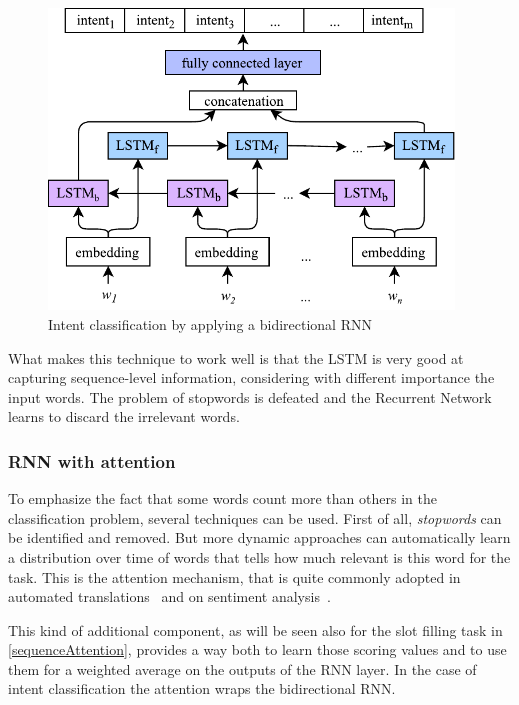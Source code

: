 
\begin{figure}[!htbp]
    \centering
    \includegraphics[max width=\linewidth,max height=8cm,keepaspectratio]{figures/intentBidirectionalRNN}
    \caption{Intent classification by applying a bidirectional RNN}\label{fig:intentBidirectionalRNN}
\end{figure}

What makes this technique to work well is that the LSTM is very good at capturing sequence-level information, considering with different importance the input words. The problem of stopwords is defeated and the Recurrent Network learns to discard the irrelevant words.

\subsubsection{RNN with attention}
To emphasize the fact that some words count more than others in the classification problem, several techniques can be used. First of all, \textit{stopwords} can be identified and removed. But more dynamic approaches can automatically learn a distribution over time of words that tells how much relevant is this word for the task. This is the attention mechanism, that is quite commonly adopted in automated translations~\cite{bahdanau2014neural} and on sentiment analysis~\cite{lin2017structured}.

This kind of additional component, as will be seen also for the slot filling task in \ref{sequenceAttention}, provides a way both to learn those scoring values and to use them for a weighted average on the outputs of the RNN layer. In the case of intent classification the attention wraps the bidirectional RNN.

